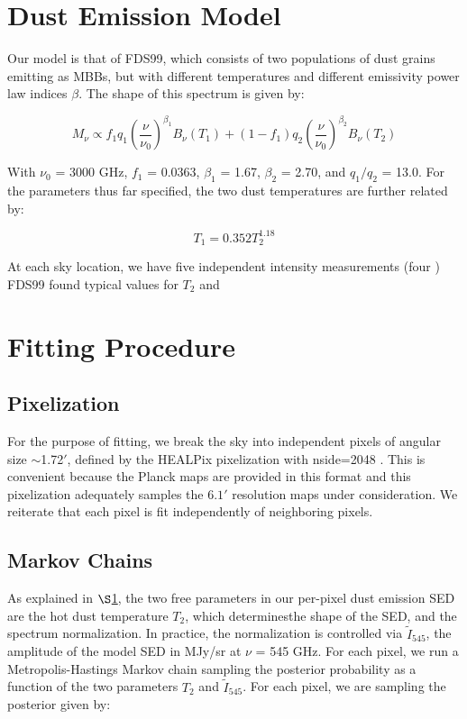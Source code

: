 \documentclass{emulateapj}
\begin{document}
\section{Dust Emission Model}
\label{sec:modeling}
Our model is that of FDS99, which consists of two populations of dust 
grains emitting as MBBs, but with different temperatures
and different emissivity power law indices $\beta$. The shape of this spectrum 
is given by:

\begin{equation}
M_{\nu} \propto f_{1}q_{1}(\frac{\nu}{\nu_{0}})^{\beta_1}B_{\nu}(T_1) + (1-f_{1})q_{2}(\frac{\nu}{\nu_0})^{\beta_2}B_{\nu}(T_2)
\end{equation}

With $\nu_0$ = 3000 GHz, $f_{1}$ = 0.0363, $\beta_1$ = 1.67, $\beta_2$ = 2.70, 
and $q_1/q_2$ = 13.0. For the parameters thus far specified, the two dust 
temperatures are further related by:

\begin{equation}
T_1 = 0.352T_2^{1.18}
\end{equation}

At each sky location, we have five independent intensity measurements (four ) 
FDS99 found typical values for $T_2$ and 

\section{Fitting Procedure}
\label{sec:fitting}

\subsection{Pixelization}
\label{sec:pix}
For the purpose of fitting, we break the sky into independent pixels of 
angular size $\sim$1.72$'$, defined by the HEALPix pixelization with nside=2048
\citep{healpix}. This is convenient because the Planck maps are provided in 
this format and this pixelization adequately samples the $6.1'$ resolution maps
under consideration. We reiterate that each pixel is fit independently of 
neighboring pixels.

\subsection{Markov Chains}
As explained in $\S$\ref{sec:modeling}, the two free parameters in our 
per-pixel dust emission SED are the hot dust temperature $T_2$, which 
determinesthe shape of the SED, and the spectrum normalization. In practice,
the normalization is controlled via $\tilde{I}_{545}$, the amplitude of the 
model SED in MJy/sr at $\nu$ = 545 GHz. For each pixel, we run a 
Metropolis-Hastings Markov chain sampling the posterior probability as a 
function of the two parameters $T_2$ and $\tilde{I}_{545}$. For each pixel, we 
are sampling the posterior given by:
\end{document}
